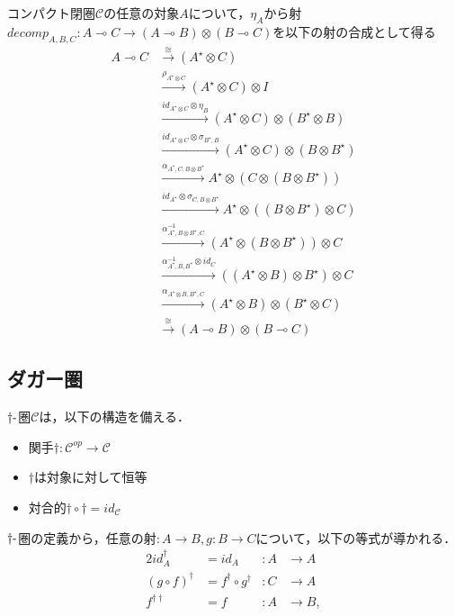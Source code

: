 \documentclass[type_judgement.tex]{subfiles}
\begin{document}
コンパクト閉圏$\mathcal{C}$の任意の対象$A$について，$\eta_A$から射$decomp_{A,B,C}: A \multimap C \rightarrow (A \multimap B) \otimes (B \multimap C)$を以下の射の合成として得る
\begin{align*}
    A \multimap C &\xrightarrow{\cong} (A^\star \otimes C) \\
                  &\xrightarrow{\rho_{A^\star \otimes C}} (A^\star \otimes C) \otimes I \\
                  &\xrightarrow{id_{A^\star \otimes C} \otimes \eta_B} (A^\star \otimes C) \otimes (B^\star \otimes B) \\
                  &\xrightarrow{id_{A^\star \otimes C} \otimes \sigma_{B^\star,B}} (A^\star \otimes C) \otimes (B \otimes B^\star) \\
                  &\xrightarrow{\alpha_{A^\star,C,B \otimes B^\star}} A^\star \otimes (C \otimes (B \otimes B^\star)) \\
                  &\xrightarrow{id_{A^\star} \otimes \sigma_{C,B \otimes B^\star}} A^\star \otimes ((B \otimes B^\star) \otimes C) \\
                  &\xrightarrow{\alpha^{-1}_{A^\star, B \otimes B^\star, C}} (A^\star \otimes (B \otimes B^\star)) \otimes C \\
                  &\xrightarrow{\alpha^{-1}_{A^\star, B, B^\star} \otimes id_C} ((A^\star \otimes B) \otimes B^\star) \otimes C \\
                  &\xrightarrow{\alpha_{A^\star \otimes B, B^\star, C}} (A^\star \otimes B) \otimes (B^\star \otimes C) \\
                  &\xrightarrow{\cong} (A \multimap B) \otimes (B \multimap C)
\end{align*}

\subsection{ダガー圏}
\begin{defn}
$\dagger\mathchar`-$圏$\mathcal{C}$は，以下の構造を備える．
\begin{itemize}
    \item 関手$\dagger:\mathcal{C}^{op} \rightarrow \mathcal{C}$
    \item $\dagger$は対象に対して恒等
    \item 対合的$\dagger\circ\dagger = id_\mathcal{C}$
\end{itemize}
\end{defn}
$\dagger\mathchar`-$圏の定義から，任意の射$:A \rightarrow B, g:B \rightarrow C$について，以下の等式が導かれる．
\begin{alignat*}{2}
    id_A^\dagger       &= id_A                      &:A &\rightarrow A \\
    (g\circ f)^\dagger &= f^\dagger \circ g^\dagger &:C &\rightarrow A \\
    f^{\dagger\dagger} &= f                         &:A &\rightarrow B,
\end{alignat*}
\end{document}
